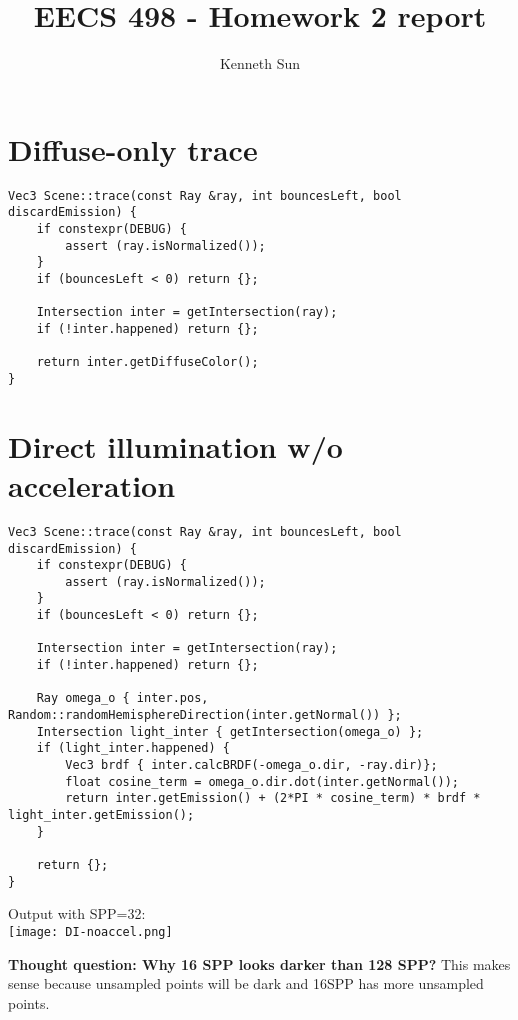 \documentclass{article}
\title{EECS 498 - Homework 2 report}
\author{Kenneth Sun}
\begin{document}
\maketitle

\section{Diffuse-only trace}
\begin{lstlisting}
Vec3 Scene::trace(const Ray &ray, int bouncesLeft, bool discardEmission) {
    if constexpr(DEBUG) {
        assert (ray.isNormalized());
    }
    if (bouncesLeft < 0) return {};

    Intersection inter = getIntersection(ray);
    if (!inter.happened) return {};

    return inter.getDiffuseColor();
}
\end{lstlisting}

\section{Direct illumination w/o acceleration}
\begin{lstlisting}
Vec3 Scene::trace(const Ray &ray, int bouncesLeft, bool discardEmission) {
    if constexpr(DEBUG) {
        assert (ray.isNormalized());
    }
    if (bouncesLeft < 0) return {};

    Intersection inter = getIntersection(ray);
    if (!inter.happened) return {};

    Ray omega_o { inter.pos, Random::randomHemisphereDirection(inter.getNormal()) };
    Intersection light_inter { getIntersection(omega_o) };
    if (light_inter.happened) {
        Vec3 brdf { inter.calcBRDF(-omega_o.dir, -ray.dir)};
        float cosine_term = omega_o.dir.dot(inter.getNormal());
        return inter.getEmission() + (2*PI * cosine_term) * brdf * light_inter.getEmission();
    }

    return {};
}
\end{lstlisting}

Output with SPP=32:\\
\texttt{[image: DI-noaccel.png]}

\textbf{Thought question: Why 16 SPP looks darker than 128 SPP?} This makes sense because unsampled points will be dark
and 16SPP has more unsampled points.
\end{document}
